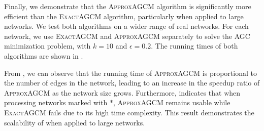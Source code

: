 \documentclass[journal]{IEEEtran}
\begin{document}
Finally, we demonstrate that the \textsc{ApproxAGCM} algorithm is significantly more efficient than the \textsc{ExactAGCM} algorithm, particularly when applied to large networks.
We test both algorithms on a wider range of real networks.
For each network, we use \textsc{ExactAGCM} and \textsc{ApproxAGCM} separately to solve the AGC minimization problem, with \(k=10\) and \(\epsilon=0.2\).
The running times of both algorithms are shown in .

From , we can observe that the running time of \textsc{ApproxAGCM} is proportional to the number of edges in the network, leading to an increase in the speedup ratio of \textsc{ApproxAGCM} as the network size grows.
Furthermore,  indicates that when processing networks marked with \(\ast\),
\textsc{ApproxAGCM} remains usable while \textsc{ExactAGCM} fails due to its high time complexity.
This result demonstrates the scalability of  when applied to large networks.
\end{document}
